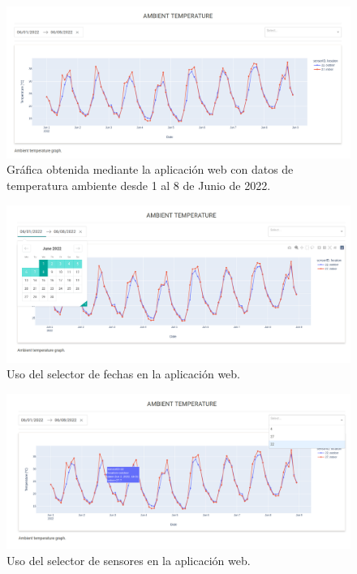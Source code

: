 \documentclass[a4paper, 12pt, oneside]{book}
\begin{document}
\begin{figure}[H]
	\centering
    \includegraphics[width=12cm, keepaspectratio]{img/ambient_temperature_01_08_junio}
    \caption{Gráfica obtenida mediante la aplicación web con datos de temperatura ambiente desde 1 al 8 de Junio de 2022.}
    \label{figura:ambient_temperature_01_08_junio}
\end{figure}

\begin{figure}[H]
	\centering
    \includegraphics[width=12cm, keepaspectratio]{img/desplegable_fecha}
    \caption{Uso del selector de fechas en la aplicación web.}
    \label{figura:desplegable_fecha}
\end{figure}

\begin{figure}[H]
	\centering
    \includegraphics[width=12cm, keepaspectratio]{img/desplegable_sensores}
    \caption{Uso del selector de sensores en la aplicación web.}
    \label{figura:desplegable_sensores}
\end{figure}
\end{document}
